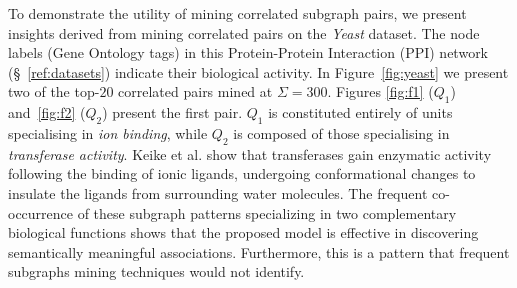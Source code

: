 To demonstrate the utility of mining correlated subgraph pairs, we present insights derived from mining correlated pairs on the \emph{Yeast} \cite{yeast_source} dataset.
The node labels (Gene Ontology tags) in this Protein-Protein Interaction (PPI) network (\S~\ref{ref:datasets}) indicate their  biological activity. %
 In Figure~\ref{fig:yeast} we present two of the top-$20$ correlated pairs mined at $\Sigma=300$. Figures \ref{fig:f1} ($Q_1$) and~\ref{fig:f2} ($Q_2$) present the first pair. %
$Q_1$ is constituted entirely of units specialising in \emph{ion
binding}, while $Q_2$ is composed of those specialising in \emph{transferase
activity}. Keike et al.\cite{pattern1,pattern2} show that transferases gain
enzymatic activity following the binding of ionic ligands, undergoing
conformational changes to insulate the ligands from surrounding water molecules.
The frequent co-occurrence of these subgraph patterns specializing in two complementary biological
functions shows that the proposed model is effective in discovering semantically meaningful associations. Furthermore, this is a pattern that frequent subgraphs mining techniques would not identify.%

